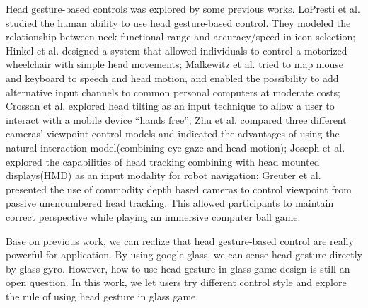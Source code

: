 Head gesture-based controls was explored by some previous works. LoPresti et al.\cite{neck} studied the human ability to use head gesture-based control. They modeled the relationship between neck functional range and accuracy/speed in icon selection; Hinkel et al.\cite{wheel} designed a system that allowed individuals to control a motorized wheelchair with simple head movements; Malkewitz et al.\cite{headdesktop} tried to map mouse and keyboard to speech and head motion, and enabled the possibility to add alternative input channels to common personal computers at moderate costs; Crossan et al.\cite{tilt} explored head tilting as an input technique to allow a user to interact with a mobile device ``hands free''; Zhu et al.\cite{tele} compared three different cameras' viewpoint control models and indicated the advantages of using the natural interaction model(combining eye gaze and head motion); Joseph et al.\cite{robot} explored the capabilities of head tracking combining with head mounted displays(HMD) as an input modality for robot navigation; Greuter et al.\cite{viewport} presented the use of commodity depth based cameras to control viewpoint from passive unencumbered head tracking. This allowed participants to maintain correct perspective while playing an immersive computer ball game.

Base on previous work, we can realize that head gesture-based control are really powerful for application. By using google glass, we can sense head gesture directly by glass gyro. However, how to use head gesture in glass game design is still an open question. In this work, we let users try different control style and explore the rule of using head gesture in glass game.



